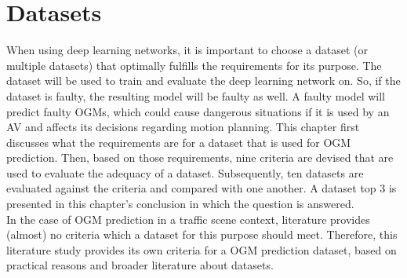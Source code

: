 \section{Datasets} \label{sec:datasets}
When using deep learning networks, it is important to choose a dataset (or multiple datasets) that optimally fulfills the requirements for its purpose. The dataset will be used to train and evaluate the deep learning network on. So, if the dataset is faulty, the resulting model will be faulty as well. A faulty model will predict faulty \glspl{OGM}, which could cause dangerous situations if it is used by an \gls{AV} and affects its decisions regarding motion planning. This chapter first discusses what the requirements are for a dataset that is used for \gls{OGM} prediction. Then, based on those requirements, nine criteria are devised that are used to evaluate the adequacy of a dataset. Subsequently, ten datasets are evaluated against the criteria and compared with one another. A dataset top 3 is presented in this chapter's conclusion in which the question  is answered. \\

In the case of \gls{OGM} prediction in a traffic scene context, literature provides (almost) no criteria which a dataset for this purpose should meet. Therefore, this literature study provides its own criteria for a \gls{OGM} prediction dataset, based on practical reasons and broader literature about datasets. \\

